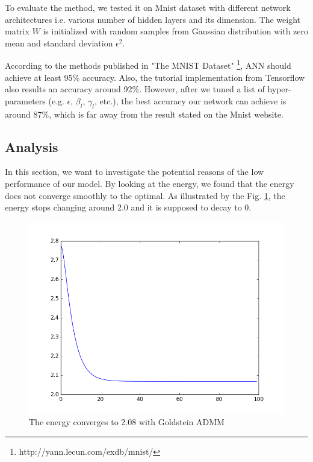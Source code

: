 \documentclass[letterpaper, 10 pt, conference]{ieeeconf}  %
\begin{document}
To evaluate the method, we tested it on Mnist dataset with different network architectures i.e. various number of hidden layers and its dimension. The weight matrix $W$ is initialized with random samples from Gaussian distribution with zero mean and standard deviation $\epsilon^2$. 

According to the methods published in "The MNIST Dataset" \footnote{http://yann.lecun.com/exdb/mnist/}, ANN should achieve at least 95\% accuracy.  Also, the tutorial implementation from Tensorflow also results an accuracy around 92\%. However, after we tuned a list of hyper-parameters (e.g. $\epsilon$, $\beta_l$, $\gamma_l$, etc.),  the best accuracy our network can achieve is around 87\%, which is far away from the result stated on the Mnist website. 

\subsection{Analysis}
In this section, we want to investigate the potential reasons of the low performance of our model. By looking at the energy, we found that the energy does not converge smoothly to the optimal. As illustrated by the Fig. \ref{fig:energySame}, the energy stops changing around 2.0 and it is supposed to decay to 0.

\begin{figure}
\centering
\includegraphics[width=\columnwidth]{figure/energy_has_lambda.png}
\caption{The energy converges to 2.08 with Goldstein ADMM}
\label{fig:energySame}
\end{figure}
\end{document}
